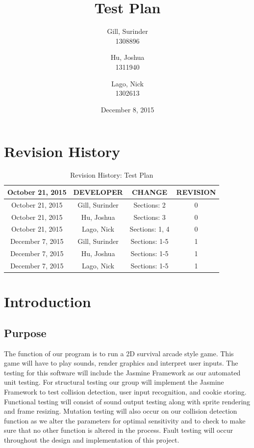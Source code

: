 \documentclass[11pt, oneside]{article}   	%
\title{Test Plan}
\author{Gill, Surinder\\
		1308896
		\and
		Hu, Joshua\\
		1311940
		\and
		Lago, Nick\\
		1302613}
\date{December 8, 2015}							%
\begin{document}
\maketitle


\newpage
\tableofcontents
\listoffigures
\listoftables

\newpage
\section{Revision History}

\begin{table}[H]
\caption{Revision History: Test Plan}
\begin{center}
\label{tab:}
\begin{tabular}{|c|c|c|c|}
\hline
\textbf{October 21, 2015} & \textbf{DEVELOPER} & \textbf{CHANGE} & \textbf{REVISION}\\
\hline
October 21, 2015 & Gill, Surinder & Sections: 2 & 0\\
\hline
October 21, 2015 & Hu, Joshua & Sections: 3 & 0\\
\hline
October 21, 2015 & Lago, Nick & Sections: 1, 4 & 0\\
\hline
December 7, 2015 & Gill, Surinder & Sections: 1-5 & 1\\
\hline
December 7, 2015 & Hu, Joshua & Sections: 1-5 & 1\\
\hline
December 7, 2015 & Lago, Nick & Sections: 1-5 & 1\\
\hline
\end{tabular}
\end{center}
\label{default}
\end{table}

\newpage
\section{Introduction}
\subsection{Purpose}
The function of our program is to run a 2D survival arcade style game. This game will have to play sounds, render graphics and interpret user inputs. The testing for this software will include the Jasmine Framework as our automated unit testing. For structural testing our group will implement the Jasmine Framework to test collision detection, user input recognition, and cookie storing.  Functional testing will consist of sound output testing along with sprite rendering and frame resizing. Mutation testing will also occur on our collision detection function as we alter the parameters for optimal sensitivity and to check to make sure that no other function is altered in the process. Fault testing will occur throughout the design and implementation of this project.
\end{document}
